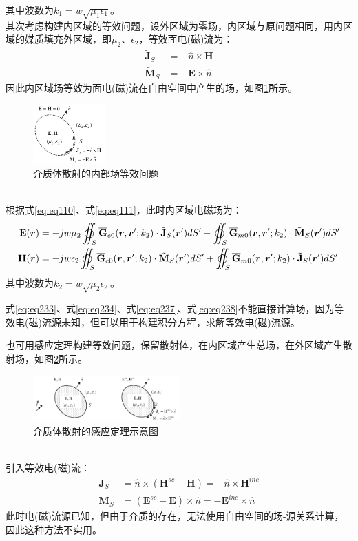 \documentclass{article}
\numberwithin{equation}{section}
\renewcommand{\vec}[1]{\boldsymbol{#1}}
\begin{document}
其中波数为$k_1=w\sqrt{\mu_1\epsilon_1}$。\\
其次考虑构建内区域的等效问题，设外区域为零场，内区域与原问题相同，用内区域的媒质填充外区域，即$\mu_2$、$\epsilon_2$，等效面电(磁)流为：
\begin{align}
    \label{eq:eq235}
    \tilde{\mathbf{J}}_S&=-\hat{n}\times\mathbf{H} \\
    \label{eq:eq236}
    \tilde{\mathbf{M}}_S&=-\mathbf{E}\times\hat{n}
\end{align}
因此内区域场等效为面电(磁)流在自由空间中产生的场，如图\ref{fig:fig23}所示。
\begin{figure}[ht]
    \centering
    \includegraphics[width=0.25\textwidth]{介质体散射的内部场等效问题.PNG}
    \caption{介质体散射的内部场等效问题}
    \label{fig:fig23}
\end{figure}
\\
根据式\ref{eq:eq110}、式\ref{eq:eq111}，此时内区域电磁场为：
\begin{align}
    \label{eq:eq237}
    \mathbf{E}(\vec{r})&=-jw\mu_2\varoiint_S\overline{\mathbf{G}}_{e0}(\vec{r},\vec{r}';k_2)\cdot\tilde{\mathbf{J}}_S(\vec{r}')dS'-\varoiint_S\overline{\mathbf{G}}_{m0}(\vec{r},\vec{r}';k_2)\cdot\tilde{\mathbf{M}}_S(\vec{r}')dS' \\
    \label{eq:eq238}
    \mathbf{H}(\vec{r})&=-jw\epsilon_2\varoiint_S\overline{\mathbf{G}}_{e0}(\vec{r},\vec{r}';k_2)\cdot\tilde{\mathbf{M}}_S(\vec{r}')dS'+\varoiint_S\overline{\mathbf{G}}_{m0}(\vec{r},\vec{r}';k_2)\cdot\tilde{\mathbf{J}}_S(\vec{r}')dS'
\end{align}
其中波数为$k_2=w\sqrt{\mu_2\epsilon_2}$。\par
式\ref{eq:eq233}、式\ref{eq:eq234}、式\ref{eq:eq237}、式\ref{eq:eq238}不能直接计算场，因为等效电(磁)流源未知，但可以用于构建积分方程，求解等效电(磁)流源。\par
也可用感应定理构建等效问题，保留散射体，在内区域产生总场，在外区域产生散射场，如图\ref{fig:fig24}所示。
\begin{figure}[ht]
    \centering
    \includegraphics[width=0.5\textwidth]{介质体散射的感应定理示意图.PNG}
    \caption{介质体散射的感应定理示意图}
    \label{fig:fig24}
\end{figure}
\\引入等效电(磁)流：
\begin{align}
    \label{eq:eq239}
    \mathbf{J}_S&=\hat{n}\times(\mathbf{H}^{sc}-\mathbf{H})=-\hat{n}\times\mathbf{H}^{inc} \\
    \label{eq:eq240}
    \mathbf{M}_S&=(\mathbf{E}^{sc}-\mathbf{E})\times\hat{n}=-\mathbf{E}^{inc}\times\hat{n}
\end{align}
此时电(磁)流源已知，但由于介质的存在，无法使用自由空间的场-源关系计算，因此这种方法不实用。
\end{document}
